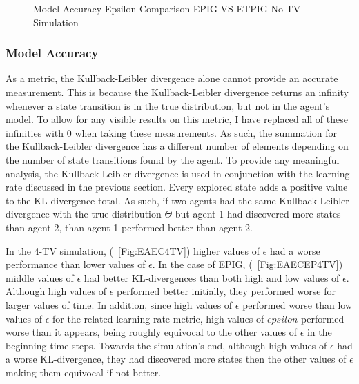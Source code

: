 \documentclass[letterpaper]{article} %
\begin{document}
\begin{figure}
	\begin{center}
		\hfill
		\hfill
	\end{center}
	\caption{Model Accuracy Epsilon Comparison EPIG VS ETPIG No-TV Simulation}
	\label{Fig:EAEC0TV}
\end{figure}

\subsubsection{Model Accuracy}
As a metric, the Kullback-Leibler divergence alone cannot provide an accurate measurement. This is because the Kullback-Leibler divergence returns an infinity whenever a state transition is in the true distribution, but not in the agent's model. To allow for any visible results on this metric, I have replaced all of these infinities with 0 when taking these measurements. As such, the summation for the Kullback-Leibler divergence has a different number of elements depending on the number of state transitions found by the agent. To provide any meaningful analysis, the Kullback-Leibler divergence is used in conjunction with the learning rate discussed in the previous section. Every explored state adds a positive value to the KL-divergence total. As such, if two agents had the same Kullback-Leibler divergence with the true distribution $\Theta$ but agent 1 had discovered more states than agent 2, than agent 1 performed better than agent 2.

In the 4-TV simulation, (\figurename~\ref{Fig:EAEC4TV}) higher values of $\epsilon$ had a worse performance than lower values of $\epsilon$. In the case of EPIG, (\figurename~\ref{Fig:EAECEP4TV}) middle values of $\epsilon$ had better KL-divergences than both high and low values of $\epsilon$. Although high values of $\epsilon$ performed better initially, they performed worse for larger values of time. In addition, since high values of $\epsilon$ performed worse than low values of $\epsilon$ for the related learning rate metric, high values of $epsilon$ performed worse than it appears, being roughly equivocal to the other values of $\epsilon$ in the beginning time steps. Towards the simulation's end, although high values of $\epsilon$ had a worse KL-divergence, they had discovered more states then the other values of $\epsilon$ making them equivocal if not better. 
\end{document}
